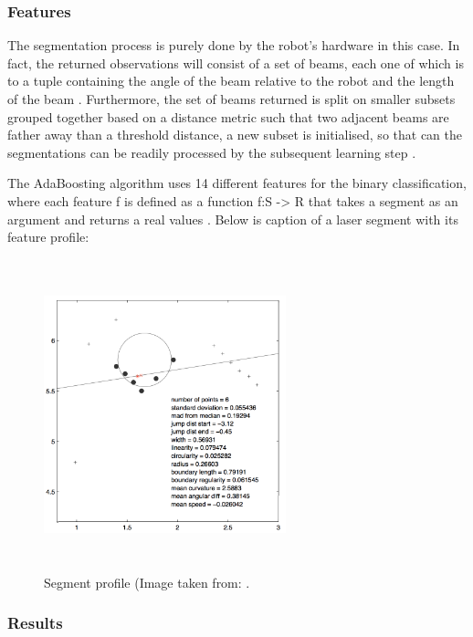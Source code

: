 \subsubsection{Features}

The segmentation process is purely done by the robot's hardware in this case. In fact, the returned observations will consist of a set of beams, each one of which is to a tuple containing the angle of the beam relative to the robot and the length of the beam \cite{arras2007using}. Furthermore, the set of beams returned is split on smaller subsets grouped together based on a distance metric such that two adjacent beams are father away than a threshold distance, a new subset is initialised, so that can the segmentations can be readily processed by the subsequent learning step \cite{arras2007using}.

The AdaBoosting algorithm uses 14 different features for the binary classification, where each feature f is defined as a function f:S -> R that takes a segment as an argument and returns a real values \cite{arras2007using}. Below is caption of a laser segment with its feature profile:

\begin{figure}[!htbp]
\begin{center}
\includegraphics[width=7cm,height=9cm,keepaspectratio]{images/segment_profile.png}
\end{center}
\caption{Segment profile (Image taken from: \cite{arras2007using}.}
\end{figure}

\subsubsection{Results}

